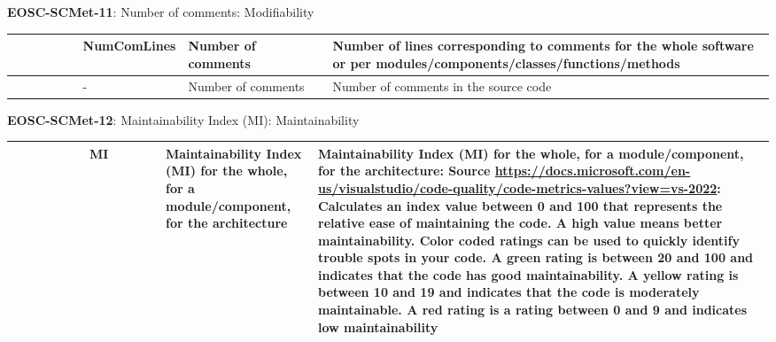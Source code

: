 \textbf{EOSC-SCMet-11}: Number of comments: Modifiability
\nopagebreak[4]
\begin{center}
    \tabletail{\hline}
    \tiny
    \begin{supertabular}{|p{0.10\linewidth}|p{0.10\linewidth}|p{0.20\linewidth}|p{0.60\linewidth}|} \hline
        \cite{montagud_systematic_2012} & NumComLines & Number of comments & Number of lines corresponding to comments for the whole software or per modules/components/classes/functions/methods\\ \hline
        \cite{tanaka_software_1998} & - & Number of comments & Number of comments in the source code\\ \hline
    \end{supertabular}
\end{center}

\textbf{EOSC-SCMet-12}: Maintainability Index (MI): Maintainability
\nopagebreak[4]
\begin{center}
    \tabletail{\hline}
    \tiny
    \begin{supertabular}{|p{0.10\linewidth}|p{0.10\linewidth}|p{0.20\linewidth}|p{0.60\linewidth}|} \hline
        \cite{montagud_systematic_2012} & MI & Maintainability Index (MI) for the whole, for a module/component, for the architecture & Maintainability Index (MI) for the whole, for a module/component, for the architecture: Source \url{https://docs.microsoft.com/en-us/visualstudio/code-quality/code-metrics-values?view=vs-2022}: Calculates an index value between 0 and 100 that represents the relative ease of maintaining the code. A high value means better maintainability. Color coded ratings can be used to quickly identify trouble spots in your code. A green rating is between 20 and 100 and indicates that the code has good maintainability. A yellow rating is between 10 and 19 and indicates that the code is moderately maintainable. A red rating is a rating between 0 and 9 and indicates low maintainability\\ \hline
    \end{supertabular}
\end{center}

